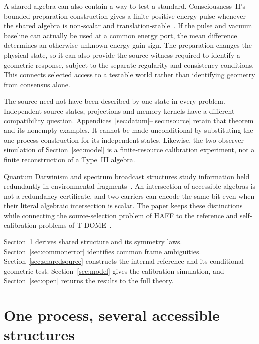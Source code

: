 \documentclass[12pt]{article}
\theoremstyle{definition}
\theoremstyle{remark}
\begin{document}
A shared algebra can also contain a way to test a standard. Consciousness~II's
bounded-preparation construction gives a finite positive-energy pulse whenever
the shared algebra is non-scalar and translation-stable~\cite{PaperII}.
If the pulse and vacuum baseline can actually be used at a common energy port,
the mean difference determines an otherwise unknown energy-gain sign.
The preparation changes the physical state, so it can also provide the source
witness required to identify a geometric response, subject to the separate
regularity and consistency conditions. This connects selected access to a
testable world rather than identifying geometry from consensus alone.

The source need not have been described by one state in every problem.
Independent source states, projections and memory kernels have a different
compatibility question. Appendices~\ref{sec:datum}--\ref{sec:nsource} retain
that theorem and its nonempty examples. It cannot be made unconditional by
substituting the one-process construction for its independent states.
Likewise, the two-observer simulation of Section~\ref{sec:model} is a
finite-resource calibration experiment, not a finite reconstruction of a
Type~III algebra.

Quantum Darwinism and spectrum broadcast structures study information held
redundantly in environmental fragments~\cite{Zurek2009,BrandaoPianiHorodecki2015,KorbiczHorodeckiHorodecki2014}.
An intersection of accessible algebras is not a redundancy certificate, and
two carriers can encode the same bit even when their literal algebraic
intersection is scalar. The paper keeps these distinctions while connecting
the source-selection problem of HAFF to the reference and self-calibration
problems of T-DOME~\cite{HAFFA,HAFFD,TDOMEII,TDOMEIII}.

Section~\ref{sec:onesource} derives shared structure and its symmetry laws.
Section~\ref{sec:commonerror} identifies common frame ambiguities.
Section~\ref{sec:sharedsource} constructs the internal reference and its
conditional geometric test. Section~\ref{sec:model} gives the calibration
simulation, and Section~\ref{sec:open} returns the results to the full theory.

\section{One process, several accessible structures}\label{sec:onesource}
\end{document}
